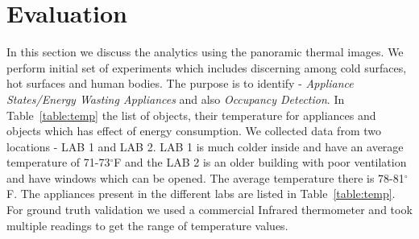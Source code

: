 %


 \section{Evaluation}

    \indent In this section we discuss the analytics using the panoramic thermal images. We perform initial set of experiments which includes discerning among cold surfaces, hot surfaces and human bodies. The purpose is to identify - \textit{ Appliance States/Energy Wasting Appliances} and also \textit{ Occupancy Detection}. In Table~\ref{table:temp} the list of objects, their temperature for appliances and objects which has effect of energy consumption. We collected data from two locations - LAB 1 and LAB 2. LAB 1 is much colder inside and have an average temperature of 71-73$^{\circ}$F and the LAB 2 is an older building with poor ventilation and have windows which can be opened. The average temperature there is 78-81$^{\circ}$F. The appliances present in the different labs are listed in Table~\ref{table:temp}. For ground truth validation we used a commercial Infrared thermometer and took multiple readings to get the range of temperature values.
   

